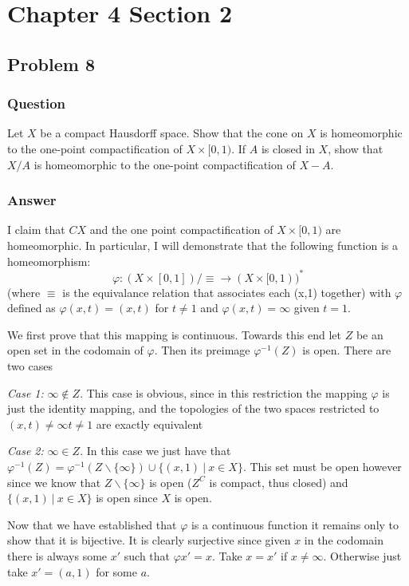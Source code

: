 \documentclass[10pt]{article}
\begin{document}
\section{Chapter 4 Section 2}

\subsection{Problem 8}

\subsubsection{Question}
Let $X$ be a compact Hausdorff space. Show that the cone on $X$ is homeomorphic to the one-point compactification of $X \times [0,1)$. If $A$ is closed in $X$, show that $X / A $ is homeomorphic to the one-point compactification of $X-A$.

\subsubsection{Answer}
I claim that $CX$ and the one point compactification of $X \times [0,1)$ are homeomorphic. In particular, I will demonstrate that the following function is a homeomorphism:
\[\varphi:  (X \times [0,1])/\equiv  \to  (X \times [0,1))^* \] (where $\equiv$ is  the equivalance relation that associates each (x,1) together) with $\varphi$ defined as  $\varphi (x,t) = (x,t)$ for $t \neq 1$ and $\varphi(x,t) = \infty$  given $t =1$. 

We first prove that this mapping is continuous. Towards this end let $Z$ be an open set in the codomain of $\varphi$. Then its preimage $\varphi^{-1}(Z)$ is open. There are two cases

\emph{Case 1: } $\infty \notin Z$. This case is obvious, since in this restriction the mapping $\varphi$ is just the identity mapping, and the topologies of the two spaces restricted to $(x,t) \neq \infty t \neq 1$ are exactly equivalent

\emph{Case 2: } $\infty \in Z$. In this case we just have that $\varphi^{-1}(Z) = \varphi^{-1}(Z \backslash \{ \infty \}) \cup \{(x,1)\ |\ x \in X\} $. This set must be open however since we know that $Z \backslash \{ \infty \}$ is open ($Z^C$ is compact, thus closed) and $\{(x,1)\ |\ x \in X\}$ is open since $X$ is open.

Now that we have established that $\varphi$ is a continuous function it remains only to show that it is bijective. It is clearly surjective since given $x $ in the codomain there is always some $x'$ such that $\varphi{x'}=x$. Take $x = x'$ if $x \neq \infty$. Otherwise just take $x' = (a,1)$ for some $a$.
\end{document}
